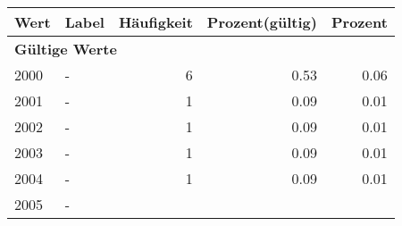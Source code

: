      \begin{longtable}{lXrrr}
     \toprule
     \textbf{Wert} & \textbf{Label} & \textbf{Häufigkeit} & \textbf{Prozent(gültig)} & \textbf{Prozent} \\
     \endhead
     \midrule
     \multicolumn{5}{l}{\textbf{Gültige Werte}}\\

     2000 &
     \multicolumn{1}{X}{ -  } &


       \num{6} &
       \num[round-mode=places,round-precision=2]{0,53} &
         \num[round-mode=places,round-precision=2]{0,06} \\

     2001 &
     \multicolumn{1}{X}{ -  } &


       \num{1} &
       \num[round-mode=places,round-precision=2]{0,09} &
         \num[round-mode=places,round-precision=2]{0,01} \\

     2002 &
     \multicolumn{1}{X}{ -  } &


       \num{1} &
       \num[round-mode=places,round-precision=2]{0,09} &
         \num[round-mode=places,round-precision=2]{0,01} \\

     2003 &
     \multicolumn{1}{X}{ -  } &


       \num{1} &
       \num[round-mode=places,round-precision=2]{0,09} &
         \num[round-mode=places,round-precision=2]{0,01} \\

     2004 &
     \multicolumn{1}{X}{ -  } &


       \num{1} &
       \num[round-mode=places,round-precision=2]{0,09} &
         \num[round-mode=places,round-precision=2]{0,01} \\

     2005 &
     \multicolumn{1}{X}{ -  } &



\end{longtable}
